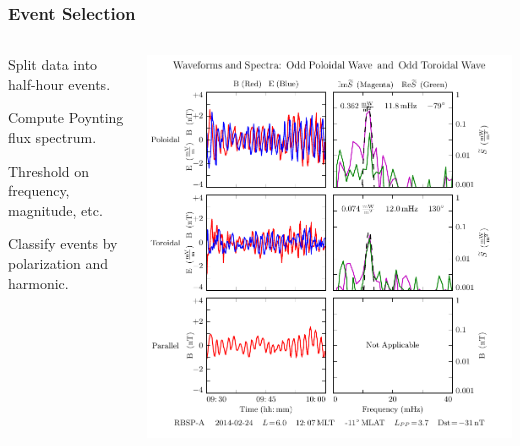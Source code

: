 \documentclass{beamer}
\begin{document}
\begin{frame}
\frametitle{Event Selection}

\begin{columns}
\begin{wideitemize}
\item Split data into half-hour events. 
\item Compute Poynting flux spectrum. 
\item Threshold on frequency, magnitude, etc. 
\item Classify events by polarization and harmonic. 
\end{wideitemize}
\includegraphics[width=\textwidth]{figures/sample_event_phase.pdf}
\end{columns}

\end{frame}

\end{document}
